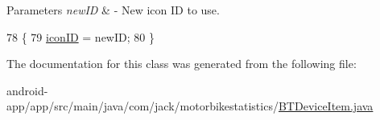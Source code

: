\begin{DoxyParams}{Parameters}
{\em new\+ID} & -\/ New icon ID to use. \\
\hline
\end{DoxyParams}

\begin{DoxyCode}
78                                      \{
79         \hyperlink{classcom_1_1jack_1_1motorbikestatistics_1_1_b_t_device_item_a77f7a3c228f87fa5e946fe77b310f805}{iconID} = newID;
80     \}
\end{DoxyCode}


The documentation for this class was generated from the following file\+:\begin{DoxyCompactItemize}
\item 
android-\/app/app/src/main/java/com/jack/motorbikestatistics/\hyperlink{_b_t_device_item_8java}{B\+T\+Device\+Item.\+java}\end{DoxyCompactItemize}
